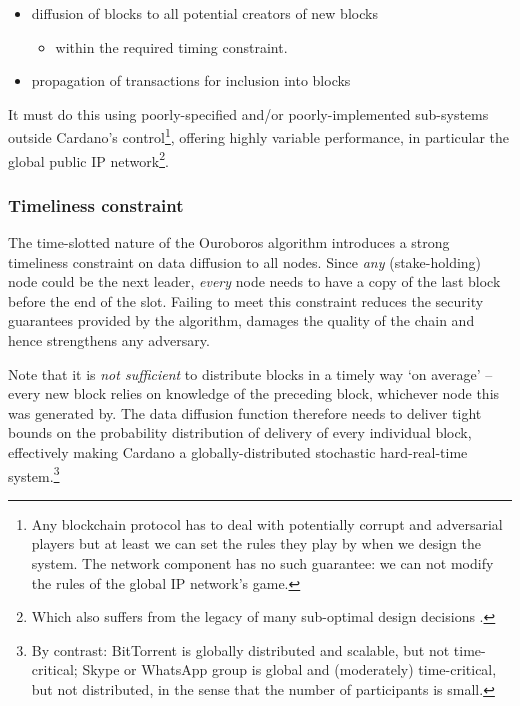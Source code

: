 \documentclass[11pt,a4paper]{article}
\begin{document}
\begin{itemize}
\item
  diffusion of blocks to all potential creators of new blocks

  \begin{itemize}
  \item
    within the required timing constraint.
  \end{itemize}
\item
  propagation of transactions for inclusion into blocks
\end{itemize}

It must do this using poorly-specified and/or poorly-implemented
sub-systems outside Cardano's control\footnote{Any blockchain protocol
  has to deal with potentially corrupt and adversarial players but at
  least we can set the rules they play by when we design the system. The
  network component has no such guarantee: we can not modify the rules
  of the global IP network's game.}, offering highly variable
performance, in particular the global public IP network\footnote{Which
  also suffers from the legacy of many sub-optimal design decisions
  \cite{JD08}.}.

\subsubsection{Timeliness constraint}
\label{timeliness-constraint}

The time-slotted nature of the Ouroboros algorithm introduces a strong
timeliness constraint on data diffusion to all nodes. Since \emph{any}
(stake-holding) node could be the next leader, \emph{every} node needs
to have a copy of the last block before the end of the slot. Failing to
meet this constraint reduces the security guarantees provided by the
algorithm, damages the quality of the chain and hence strengthens any
adversary.

Note that it is \emph{not sufficient} to distribute blocks in a timely
way `on average' -- every new block relies on knowledge of the preceding
block, whichever node this was generated by. The data diffusion function
therefore needs to deliver tight bounds on the probability distribution
of delivery of every individual block, effectively making Cardano a
globally-distributed stochastic hard-real-time system.\footnote{By
  contrast: BitTorrent is globally distributed and scalable, but not
  time-critical; Skype or WhatsApp group is global and (moderately)
  time-critical, but not distributed, in the sense that the number of
  participants is small.}
\end{document}
